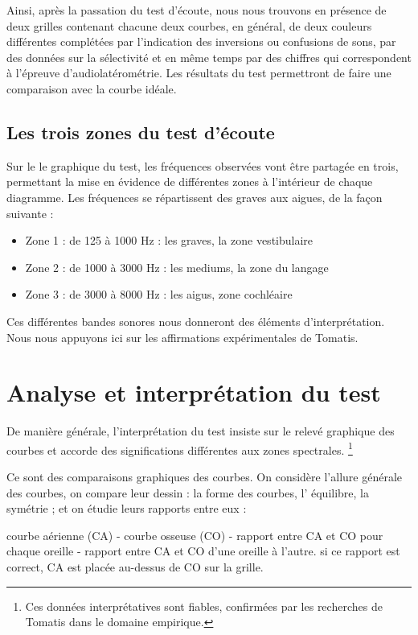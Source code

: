       



 
Ainsi, après la passation du test d\textquoteright écoute, nous nous
trouvons en présence de deux grilles contenant chacune deux courbes,
en général, de deux couleurs différentes complétées par l'indication
des inversions ou confusions de sons, par des données sur la sélectivité
et en même temps par des chiffres qui correspondent à l'épreuve d'audiolatérométrie.
Les résultats du test permettront de faire une comparaison avec la
courbe idéale.


\subsection{Les trois zones du test d'écoute }
Sur le le graphique du test, les fréquences observées vont être partagée en
trois, permettant la mise en évidence de différentes zones à l\textquoteright intérieur
de chaque diagramme. Les fréquences se répartissent des 
graves aux aigues, de la façon suivante :
\begin{itemize}
\item Zone 1 : de 125 à 1000 Hz : les graves, la zone vestibulaire
\item Zone 2 : de 1000 à 3000 Hz : les mediums, la zone du langage
\item Zone 3 : de 3000 à 8000 Hz : les aigus, zone cochléaire
\end{itemize}
Ces différentes bandes sonores nous donneront des éléments
d'interprétation.
Nous nous appuyons ici sur les affirmations expérimentales de Tomatis.


\section {Analyse et interprétation du test}


De manière générale, l'interprétation du test insiste sur le relevé graphique
des
courbes et accorde des
significations différentes aux zones spectrales.
\footnote{ Ces données interprétatives sont fiables, confirmées par
  les recherches de Tomatis dans le domaine
  empirique.}

Ce sont des comparaisons graphiques des courbes. 
On considère l'allure générale des courbes, on compare leur dessin
: la forme des courbes, l' équilibre, la symétrie ; et on étudie leurs
rapports entre eux : 

courbe aérienne (CA) - courbe osseuse (CO) - rapport entre CA et CO
pour chaque oreille - rapport entre CA et CO d\textquoteright une
oreille à l'autre. si ce rapport est correct, CA est placée au-dessus
de CO sur la grille.


